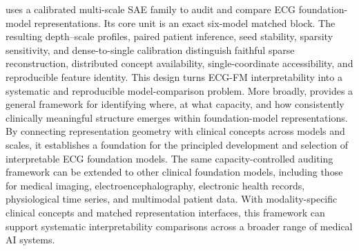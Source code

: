 \bench{} uses a calibrated multi-scale SAE family to audit and compare ECG foundation-model representations. Its core unit is an exact six-model matched block. The resulting depth--scale profiles, paired patient inference, seed stability, sparsity sensitivity, and dense-to-single calibration distinguish faithful sparse reconstruction, distributed concept availability, single-coordinate accessibility, and reproducible feature identity. This design turns ECG-FM interpretability into a systematic and reproducible model-comparison problem. More broadly, \bench{} provides a general framework for identifying where, at what capacity, and how consistently clinically meaningful structure emerges within foundation-model representations. By connecting representation geometry with clinical concepts across models and scales, it establishes a foundation for the principled development and selection of interpretable ECG foundation models. The same capacity-controlled auditing framework can be extended to other clinical foundation models, including those for medical imaging, electroencephalography, electronic health records, physiological time series, and multimodal patient data. With modality-specific clinical concepts and matched representation interfaces, this framework can support systematic interpretability comparisons across a broader range of medical AI systems.
